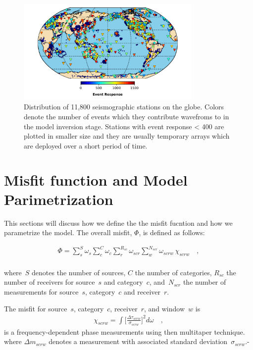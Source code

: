 \documentclass[extra,mreferee]{gji}
\begin{document}
\begin{figure}
  \includegraphics[width=0.8\textwidth]{figures/station_map.pdf}
  \caption{Distribution of 11,800 seismographic stations on the globe. Colors denote the number of events which they contribute wavefroms to in the model inversion stage. Stations with event response < 400 are plotted in smaller size and they are usually temporary arrays which are deployed over a short period of time.}
  \label{fig:stations}
  \centering
\end{figure}

\section{Misfit function and Model Parimetrization}

This sections will discuss how we define the the misfit fucntion and how we parametrize the model.
The overall misfit, $\Phi$, is defined as follows:

\begin{align}
\label{eq:misfit}
\Phi = \sum_{s}^{S} \omega_s \sum_{c}^{C} \omega_{c} \sum_{r}^{R_{sc}} \omega_{scr} \sum_{w}^{N_{scr}} \omega_{scrw}\, \chi_{scrw}
\quad ,
\end{align}\\
where~$S$ denotes the number of sources, $C$ the number of categories,
$R_{sc}$ the number of receivers for source~$s$ and category~$c$,
and~$N_{scr}$ the number of measurements for source~$s$, category~$c$
and receiver~$r$.

The misfit for source~$s$, category~$c$, receiver~$r$, and window~$w$ is
\begin{align}
  \chi_{scrw} = \int \Big[ \frac {\Delta \tau_{scrw}} {\sigma_{scrw}} \Big]^2 d\omega
\quad ,
\end{align}
is a frequency-dependent phase measurements using then multitaper technique.
where $\Delta m_{scrw}$ denotes a measurement with associated standard deviation~$\sigma_{scrw}$.-
\end{document}
